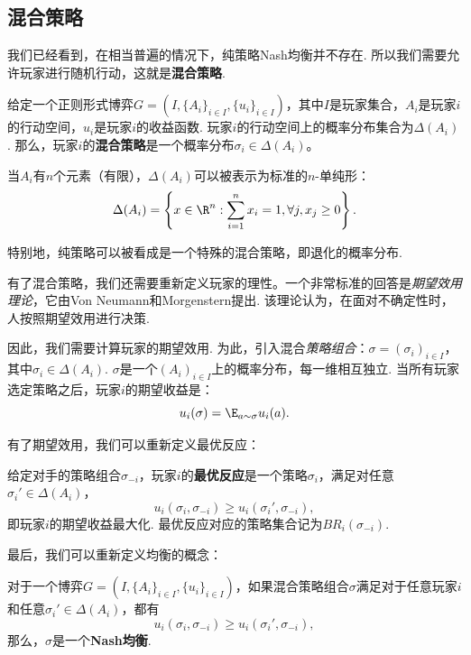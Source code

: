 \subsection{混合策略}
我们已经看到，在相当普遍的情况下，纯策略Nash均衡并不存在. 所以我们需要允许玩家进行随机行动，这就是\textbf{混合策略}. 

\begin{definition}[混合策略]
给定一个正则形式博弈$G=(I,\{A_i\}_{i\in I},\{u_i\}_{i\in I})$，其中$I$是玩家集合，$A_i$是玩家$i$的行动空间，$u_i$是玩家$i$的收益函数. 玩家$i$的行动空间上的概率分布集合为$\Delta(A_i)$. 那么，玩家$i$的\textbf{混合策略}是一个概率分布$\sigma_i\in\Delta(A_i)$。
\end{definition}

当$A_i$有$n$个元素（有限），$\Delta(A_i)$可以被表示为标准的$n$-单纯形：
    \[\Delta(A_i)=\left\{x\in\R^n:\sum_{i=1}^n x_i=1,\forall j,x_j\geq 0\right\}.\]

特别地，纯策略可以被看成是一个特殊的混合策略，即退化的概率分布.

有了混合策略，我们还需要重新定义玩家的理性。一个非常标准的回答是\emph{期望效用理论}，它由Von Neumann和Morgenstern提出. 该理论认为，在面对不确定性时，人按照期望效用进行决策. 


因此，我们需要计算玩家的期望效用. 为此，引入混合\emph{策略组合}：$\sigma=(\sigma_i)_{i\in I}$，其中$\sigma_i\in\Delta(A_i)$. $\sigma$是一个$(A_i)_{i\in I}$上的概率分布，每一维相互独立. 当所有玩家选定策略之后，玩家$i$的期望收益是：
    \[u_i(\sigma)=\E_{a\sim\sigma} u_i(a).\]

有了期望效用，我们可以重新定义最优反应：

\begin{definition}[最优反应]
给定对手的策略组合$\sigma_{-i}$，玩家$i$的\textbf{最优反应}是一个策略$\sigma_i$，满足对任意$\sigma_i'\in \Delta(A_i)$，
    \[u_i(\sigma_i,\sigma_{-i})\geq u_i(\sigma_i',\sigma_{-i}),\]
即玩家$i$的期望收益最大化. 最优反应对应的策略集合记为$BR_i(\sigma_{-i})$.
\end{definition}

最后，我们可以重新定义均衡的概念：

\begin{definition}[Nash均衡]
对于一个博弈$G=(I,\{A_i\}_{i\in I},\{u_i\}_{i\in I})$，如果混合策略组合$\sigma$满足对于任意玩家$i$和任意$\sigma_i'\in \Delta(A_i)$，都有
\[u_i(\sigma_i,\sigma_{-i})\geq u_i(\sigma_i',\sigma_{-i}),\]
那么，$\sigma$是一个\textbf{Nash均衡}.
\end{definition}

